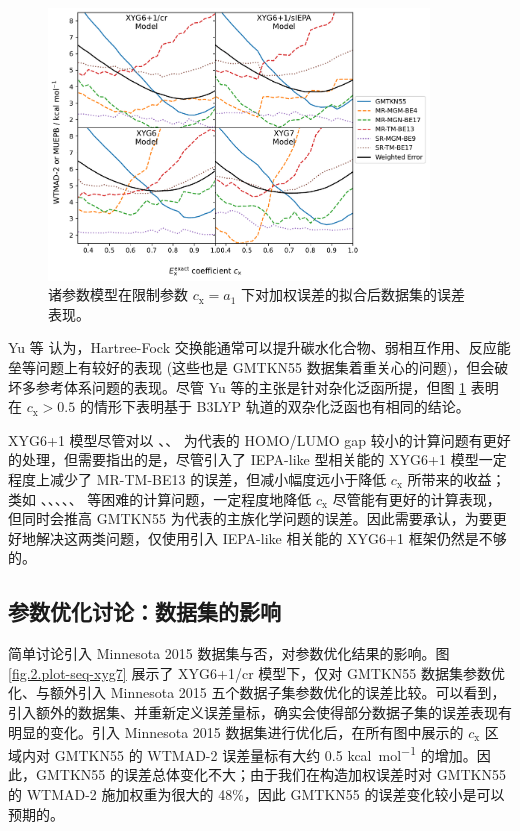 \begin{figure}[h]
  \centering
  \includegraphics[width=0.9\textwidth]{assets/plot-seq.pdf}
  \caption{诸参数模型在限制参数 $c_\mathrm{x} = a_1$ 下对加权误差的拟合后数据集的误差表现。}
  \label{fig.2.plot-seq}
\end{figure}

Yu 等\cite{Yu-Truhlar.CS.2016} 认为，Hartree-Fock 交换能通常可以提升碳水化合物、弱相互作用、反应能垒等问题上有较好的表现 (这些也是 GMTKN55 数据集着重关心的问题)，但会破坏多参考体系问题的表现。尽管 Yu 等的主张是针对杂化泛函所提，但图 \ref{fig.2.plot-seq} 表明在 $c_\mathrm{x} > 0.5$ 的情形下表明基于 B3LYP 轨道的双杂化泛函也有相同的结论。

XYG6+1 模型尽管对以 、、 为代表的 HOMO/LUMO gap 较小的计算问题有更好的处理，但需要指出的是，尽管引入了 IEPA-like 型相关能的 XYG6+1 模型一定程度上减少了 MR-TM-BE13 的误差，但减小幅度远小于降低 $c_\mathrm{x}$ 所带来的收益；类如 、、、、、 等困难的计算问题，一定程度地降低 $c_\mathrm{x}$ 尽管能有更好的计算表现，但同时会推高 GMTKN55 为代表的主族化学问题的误差。因此需要承认，为要更好地解决这两类问题，仅使用引入 IEPA-like 相关能的 XYG6+1 框架仍然是不够的。

\subsection{参数优化讨论：数据集的影响}
\label{sec.2.propotion-dataset}

简单讨论引入 Minnesota 2015 数据集与否，对参数优化结果的影响。图 \ref{fig.2.plot-seq-xyg7} 展示了 XYG6+1/cr 模型下，仅对 GMTKN55 数据集参数优化、与额外引入 Minnesota 2015 五个数据子集参数优化的误差比较。可以看到，引入额外的数据集、并重新定义误差量标，确实会使得部分数据子集的误差表现有明显的变化。引入 Minnesota 2015 数据集进行优化后，在所有图中展示的 $c_\mathrm{x}$ 区域内对 GMTKN55 的 WTMAD-2 误差量标有大约 0.5 \si{kcal.mol^{-1}} 的增加。因此，GMTKN55 的误差总体变化不大；由于我们在构造加权误差时对 GMTKN55 的 WTMAD-2 施加权重为很大的 48\%，因此 GMTKN55 的误差变化较小是可以预期的。

